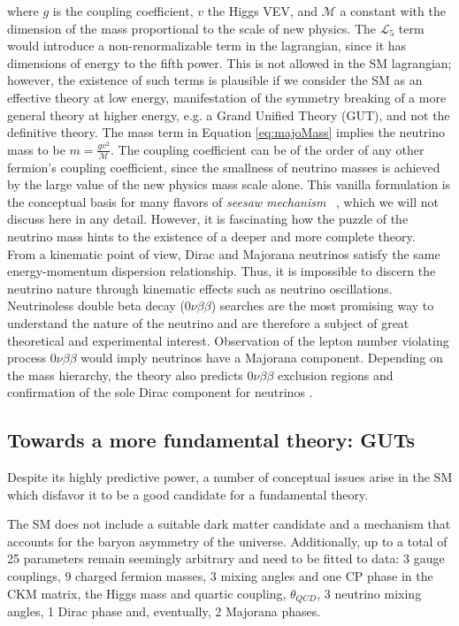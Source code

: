  where $g$ is the coupling coefficient, $v$ the Higgs VEV, and $\mathcal{M}$ a constant with the dimension of the mass proportional to the scale of new physics. The  $\mathcal{L}_5$ term would introduce a non-renormalizable term in the lagrangian, since it has dimensions of energy to the fifth power.
This is not allowed in the SM lagrangian; however, the existence of such terms is plausible if we consider the SM as an effective theory at low energy, manifestation of the symmetry breaking of a more general theory at higher energy, e.g. a Grand Unified Theory (GUT), and not the definitive theory.
The mass term in Equation \ref{eq:majoMass} implies the neutrino mass to be  $m = \frac{g v^2}{\mathcal{M}}$. The coupling coefficient can be of the order of any other fermion's coupling coefficient, since the smallness of neutrino masses is achieved by the large value of the new physics mass scale alone. This vanilla formulation is the conceptual basis for many flavors of \emph{seesaw mechanism} ~\cite{Yanagida1980}, which we will not discuss here in any detail. However, it is fascinating how the puzzle of the neutrino mass hints to the existence of a deeper and more complete theory.\\
From a kinematic point of view, Dirac and Majorana neutrinos satisfy the same energy-momentum dispersion relationship. Thus, it is impossible to discern the neutrino nature through kinematic effects such as neutrino oscillations. Neutrinoless double beta decay ($0\nu\beta\beta$) searches are the most promising way to understand the nature of the neutrino and are therefore a subject of great theoretical and experimental interest. Observation of the lepton number violating process  $0\nu\beta\beta$  would imply neutrinos have a Majorana component. Depending on the mass hierarchy, the theory also predicts  $0\nu\beta\beta$  exclusion regions and confirmation of the sole Dirac component for neutrinos \cite{DellOro2016}.\\


\subsection{Towards a more fundamental theory: GUTs}\label{ch:GUTsTheory}
Despite its highly predictive power, a number of conceptual issues arise in the SM which disfavor it to be a good candidate for a fundamental theory.

The SM does not include a suitable dark matter candidate and a mechanism that accounts for the baryon asymmetry of the universe.  Additionally, up to a total of 25 parameters remain seemingly arbitrary and need to be fitted to data: 3 gauge couplings, 9 charged fermion masses, 3 mixing angles and one CP phase in the CKM matrix, the Higgs mass and quartic coupling, $\theta_{QCD}$, 3 neutrino mixing angles, 1 Dirac phase and, eventually,  2 Majorana phases. 

